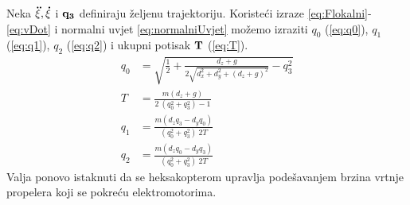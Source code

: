 \documentclass[times, utf8, diplomski]{fer}
\begin{document}
Neka $\bf \ddot{\xi}, \dot{\xi}$ i $\bf q_3$ definiraju željenu trajektoriju. Koristeći izraze \ref{eq:Flokalni}-\ref{eq:vDot} i normalni uvjet \ref{eq:normalniUvjet} možemo izraziti $q_0$ (\ref{eq:q0}), $q_1$ (\ref{eq:q1}), $q_2$ (\ref{eq:q2}) i ukupni potisak $\bf T$ (\ref{eq:T}). 
\begin{align}
q_0 &= \sqrt{\frac{1}{2} + \frac{d_z+g}{2\sqrt{d^2_x+d^2_y+(d_z+g)^2}}-q^2_3} \label{eq:q0} \\
T &= \frac{m(d_z + g)}{2~(q^2_0 + q^2_3)-1} \label{eq:T} \\
q_1 &= \frac{m(d_z q_3 - d_y q_0)}{(q^2_0 + q^2_3)~2T} \label{eq:q1} \\
q_2 &= \frac{m(d_z q_0 - d_y q_3)}{(q^2_0 + q^2_3)~2T} \label{eq:q2}
\end{align}
Valja ponovo istaknuti da se heksakopterom upravlja podešavanjem brzina vrtnje propelera koji se pokreću elektromotorima. 
\end{document}

